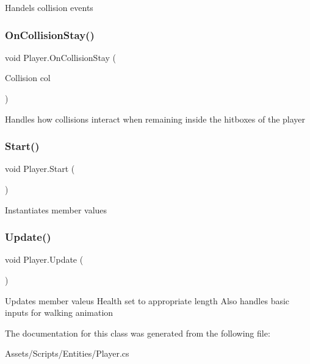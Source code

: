 Handels collision events \mbox{\label{class_player_a281fbfe9664d247f3e4d4b2911b00dbe}} 
\subsubsection{\texorpdfstring{On\+Collision\+Stay()}{OnCollisionStay()}}
{\footnotesize\ttfamily void Player.\+On\+Collision\+Stay (\begin{DoxyParamCaption}\item[{Collision}]{col }\end{DoxyParamCaption})\hspace{0.3cm}{\ttfamily [private]}}

Handles how collisions interact when remaining inside the hitboxes of the player \mbox{\label{class_player_a1a09a3ded16ac1646f6bdd4f25fe0ddd}} 
\subsubsection{\texorpdfstring{Start()}{Start()}}
{\footnotesize\ttfamily void Player.\+Start (\begin{DoxyParamCaption}{ }\end{DoxyParamCaption})\hspace{0.3cm}{\ttfamily [private]}}

Instantiates member values \mbox{\label{class_player_aace80372e18e32fe177e295fe5d93ba8}} 
\subsubsection{\texorpdfstring{Update()}{Update()}}
{\footnotesize\ttfamily void Player.\+Update (\begin{DoxyParamCaption}{ }\end{DoxyParamCaption})\hspace{0.3cm}{\ttfamily [private]}}

Updates member valeus Health set to appropriate length Also handles basic inputs for walking animation 

The documentation for this class was generated from the following file\+:\begin{DoxyCompactItemize}
\item 
Assets/\+Scripts/\+Entities/Player.\+cs\end{DoxyCompactItemize}
